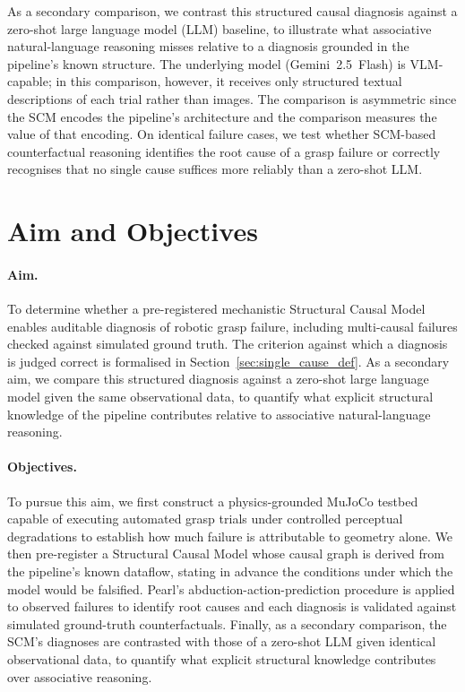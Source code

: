 \documentclass[11pt,a4paper]{report}
\begin{document}
As a secondary comparison, we contrast this structured causal diagnosis against a zero-shot large language model (LLM) baseline, to illustrate what associative natural-language reasoning misses relative to a diagnosis grounded in the pipeline's known structure. The underlying model (Gemini~2.5~Flash) is VLM-capable; in this comparison, however, it receives only structured textual descriptions of each trial rather than images. The comparison is asymmetric since the SCM encodes the pipeline's architecture and the comparison measures the value of that encoding. On identical failure cases, we test whether SCM-based counterfactual reasoning identifies the root cause of a grasp failure or correctly recognises that no single cause suffices more reliably than a zero-shot LLM.

\section{Aim and Objectives}
\label{sec:aims}

\paragraph{Aim.} To determine whether a pre-registered mechanistic Structural Causal Model enables auditable diagnosis of robotic grasp failure, including multi-causal failures checked against simulated ground truth. The criterion against which a diagnosis is judged correct is formalised in Section~\ref{sec:single_cause_def}. As a secondary aim, we compare this structured diagnosis against a zero-shot large language model given the same observational data, to quantify what explicit structural knowledge of the pipeline contributes relative to associative natural-language reasoning.

\paragraph{Objectives.} To pursue this aim, we first construct a physics-grounded MuJoCo testbed capable of executing automated grasp trials under controlled perceptual degradations to establish how much failure is attributable to geometry alone. We then pre-register a Structural Causal Model whose causal graph is derived from the pipeline's known dataflow, stating in advance the conditions under which the model would be falsified. Pearl's abduction-action-prediction procedure is applied to observed failures to identify root causes and each diagnosis is validated against simulated ground-truth counterfactuals. Finally, as a secondary comparison, the SCM's diagnoses are contrasted with those of a zero-shot LLM given identical observational data, to quantify what explicit structural knowledge contributes over associative reasoning.
\end{document}
